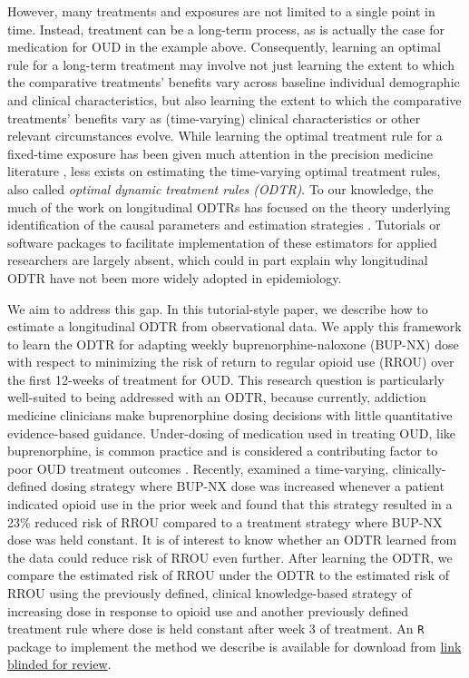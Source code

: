 \documentclass[11pt]{article}
\begin{document}
However, many treatments and exposures are not limited to a single point in time. Instead, treatment can be a long-term process, as is actually the case for medication for OUD in the example above. Consequently, learning an optimal rule for a long-term treatment may involve not just learning the extent to which the comparative treatments' benefits vary across baseline individual demographic and clinical characteristics, but also learning the extent to which the comparative treatments' benefits vary as (time-varying) clinical characteristics or other relevant circumstances evolve. While learning the optimal treatment rule for a fixed-time exposure has been given much attention in the precision medicine literature \citep[e.g.,][]{van2015targeted,MontoyavanderLaanLuedtkeSkeemCoylePetersen2022}, less exists on estimating the time-varying optimal treatment rules, also called \textit{optimal dynamic treatment rules (ODTR)}. To our knowledge, the much of the work on longitudinal ODTRs has focused on the theory underlying identification of the causal parameters and estimation strategies \citep{luedtkeSLodtr}. Tutorials or software packages to facilitate implementation of these estimators for applied researchers are largely absent, which could in part explain why longitudinal ODTR have not been more widely adopted in epidemiology.

We aim to address this gap. In this tutorial-style paper, we describe how to estimate a longitudinal ODTR from observational data. We apply this framework to learn the ODTR for adapting weekly buprenorphine-naloxone (BUP-NX) dose with respect to minimizing the risk of return to regular opioid use (RROU) over the first 12-weeks of treatment for OUD. This research question is particularly well-suited to being addressed with an ODTR, because currently, addiction medicine clinicians make buprenorphine dosing decisions with little quantitative evidence-based guidance. Under-dosing of medication used in treating OUD, like buprenorphine, is common practice and is considered a contributing factor to poor OUD treatment outcomes \citep{gordon2015patterns,d2019evidence}. Recently, \citet{rudolph2022dose} examined a time-varying, clinically-defined dosing strategy where BUP-NX dose was increased whenever a patient indicated opioid use in the prior week and found that this strategy resulted in a 23\% reduced risk of RROU compared to a treatment strategy where BUP-NX dose was held constant. It is of interest to know whether an ODTR learned from the data could reduce risk of RROU even further. After learning the ODTR, we compare the estimated risk of RROU under the ODTR to the estimated risk of RROU using the previously defined, clinical knowledge-based strategy of increasing dose in response to opioid use \citep{rudolph2022dose} and another previously defined treatment rule where dose is held constant after week 3 of treatment. An \texttt{R} package to implement the method we describe is available for download from 
\url{link blinded for review}.
\end{document}
